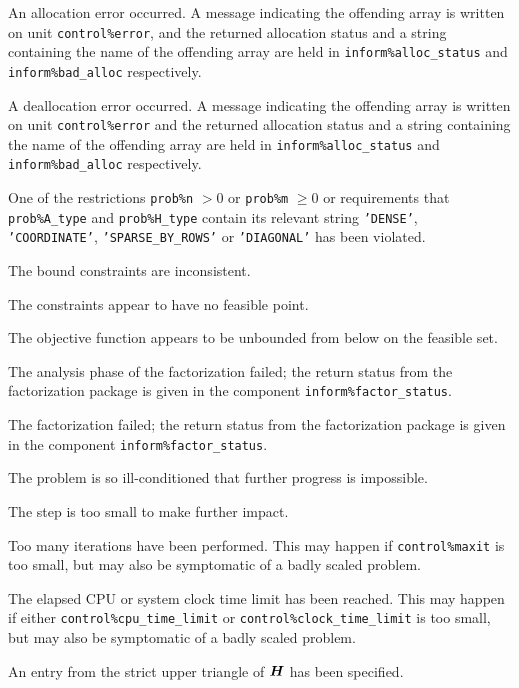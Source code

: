\documentclass{galahad}
\begin{document}
\begin{description}

 An allocation error occurred. A message indicating 
the offending 
array is written on unit {\tt control\%error}, and the returned allocation 
status and a string containing the name of the offending array
are held in {\tt inform\%alloc\_\-status}
and {\tt inform\%bad\_alloc} respectively.

 A deallocation error occurred. 
A message indicating the offending 
array is written on unit {\tt control\%error} and the returned allocation 
status and a string containing the name of the offending array
are held in {\tt inform\%alloc\_\-status}
and {\tt inform\%bad\_alloc} respectively.

 One of the restrictions 
 {\tt prob\%n} $> 0$ or {\tt prob\%m} $\geq  0$
    or requirements that {\tt prob\%A\_type} 
    and {\tt prob\%H\_type} contain its relevant string
    {\tt 'DENSE'}, {\tt 'COORDINATE'}, {\tt 'SPARSE\_BY\_ROWS'}
    or {\tt 'DIAGONAL'}
    has been violated.


 The bound constraints are inconsistent.

 The constraints appear to have no feasible point.

 The objective function appears to be unbounded 
  from below on the feasible set.

 The analysis phase of the factorization failed; 
  the return status from the factorization
    package is given in the component {\tt inform\%fac\-t\-or\_status}.

 The factorization failed; the return status 
  from the factorization
    package is given in the component {\tt inform\%fac\-t\-or\_status}.

 The problem is so ill-conditioned that 
 further progress is impossible.

 The step is too small to make further impact.

 Too many iterations have been performed. 
   This may happen if
    {\tt control\%maxit} is too small, but may also be symptomatic of 
    a badly scaled problem.

 The elapsed CPU or system clock time limit has been 
    reached. This may happen if either {\tt control\%cpu\_time\_limit} or
    {\tt control\%clock\_time\_limit} is too small, but may also be symptomatic 
    of a badly scaled problem.

 An entry from the strict upper triangle of ${\bm{H}}$ 
 has been specified.

\end{description}
\end{document}
